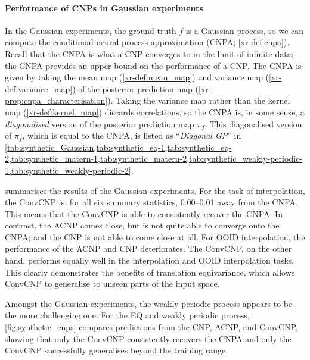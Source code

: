 \documentclass[12pt, twoside]{report}
\newcommand{\xrprefix}[1]{xr-#1}
\begin{document}
\afterpage{\FloatBarrier}


\paragraph{Performance of CNPs in Gaussian experiments}
In the Gaussian experiments, the ground-truth $f$ is a Gaussian process, so we can compute the conditional neural process approximation (CNPA; \cref{\xrprefix{def:cnpa}}).
Recall that the CNPA is what a CNP converges to in the limit of infinite data;
the CNPA provides an upper bound on the performance of a CNP.
The CNPA is given by taking the mean map (\cref{\xrprefix{def:mean_map}}) and variance map (\cref{\xrprefix{def:variance_map}}) of the posterior prediction map (\cref{\xrprefix{prop:cnpa_characterisation}}). 
Taking the variance map rather than the kernel map (\cref{\xrprefix{def:kernel_map}}) discards correlations,
so the CNPA is, in some sense, a \emph{diagonalised} version of the posterior prediction map $\pi_f$.
This diagonalised version of $\pi_f$, which is equal to the CNPA, is listed as ``\emph{Diagonal GP}'' in \cref{tab:synthetic_Gaussian,tab:synthetic_eq-1,tab:synthetic_eq-2,tab:synthetic_matern-1,tab:synthetic_matern-2,tab:synthetic_weakly-periodic-1,tab:synthetic_weakly-periodic-2}.

 summarises the results of the Gaussian experiments.
For the task of interpolation, the ConvCNP is, for all six summary statistics, 0.00--0.01 away from the CNPA.
This means that the ConvCNP is able to consistently recover the CNPA.
In contrast, the ACNP comes close, but is not quite able to converge onto the CNPA;
and the CNP is not able to come close at all.
%
For OOID interpolation, the performance of the ACNP and CNP deteriorates.
The ConvCNP, on the other hand, performs equally well in the interpolation and OOID interpolation tasks.
This clearly demonstrates the benefits of translation equivariance,
which allows ConvCNP to generalise to unseen parts of the input space. 

Amongst the Gaussian experiments, the weakly periodic process appears to be the more challenging one.
For the EQ and weakly periodic process, \cref{fig:synthetic_cnps} compares predictions from the CNP, ACNP, and ConvCNP, showing that only the ConvCNP consistently recovers the CNPA and only the ConvCNP successfully generalises beyond the training range. 
\end{document}
